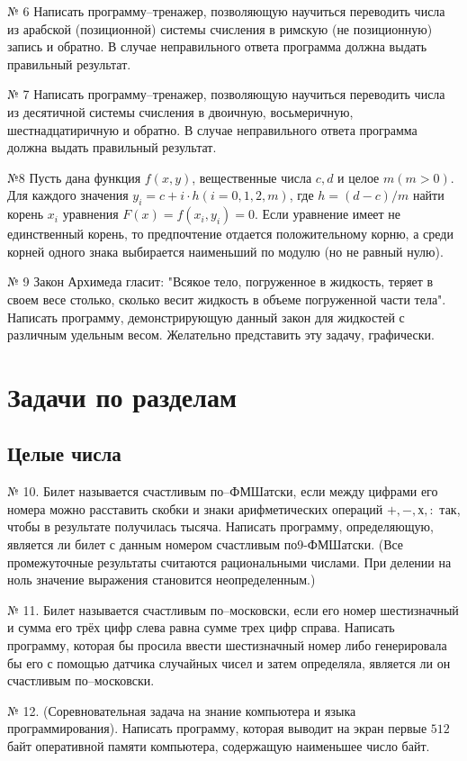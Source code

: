 № 6 Написать программу--тренажер, позволяющую научиться переводить числа из арабской (позиционной) системы счисления в римскую (не позиционную) запись и обратно. В случае неправильного ответа программа должна выдать правильный результат.

№ 7 Написать программу--тренажер, позволяющую научиться переводить числа из десятичной системы счисления в двоичную, восьмеричную, шестнадцатиричную и обратно. В случае неправильного ответа программа должна выдать правильный результат.

№8 Пусть дана функция $f(x,y)$, вещественные числа $c, d$ и целое $m (m>0)$. Для каждого значения $y_i = c + i\cdot h (i= 0,1,2, m)$, где $h = (d-c)/m$ найти корень $x_i$ уравнения $F(x) = f(x_i, y_i) = 0$. Если уравнение имеет не единственный корень, то предпочтение отдается положительному корню, а среди корней одного знака выбирается наименьший по модулю (но не равный нулю).

№ 9 Закон Архимеда гласит: "Всякое тело, погруженное в жидкость, теряет в своем весе столько, сколько весит жидкость в объеме погруженной части тела". Написать программу, демонстрирующую данный закон для жидкостей с различным удельным весом. Желательно представить эту задачу, графически.

\section{Задачи по разделам}

\subsection{Целые числа}

№ 10. Билет называется счастливым по--ФМШатски, если между цифрами его номера можно расставить скобки и знаки арифметических операций $+, -, х , :$ так, чтобы в результате получилась тысяча. Написать программу, определяющую, является ли билет с данным номером счастливым по9-ФМШатски. (Все промежуточные результаты считаются рациональными числами. При делении на ноль значение выражения становится неопределенным.)

№ 11. Билет называется счастливым по--московски, если его номер шестизначный и сумма его трёх цифр слева равна сумме трех цифр справа. Написать программу, которая бы просила ввести шестизначный номер либо генерировала бы его с помощью датчика случайных чисел и затем определяла, является ли он счастливым по--московски.

№ 12. (Соревновательная задача на знание компьютера и языка программирования). Написать программу, которая выводит на экран первые $512$ байт оперативной памяти компьютера, содержащую наименьшее число байт.

